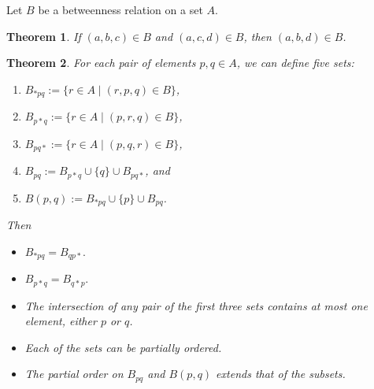 \documentclass[12pt]{article}
\newtheorem{thm}{Theorem}
\begin{document}
Let $B$ be a betweenness relation on a set $A$.
\begin{thm}
\item If $(a,b,c)\in B$ and $(a,c,d)\in B$, then $(a,b,d)\in B$.
\end{thm}
\begin{thm}
For each pair of elements $p,q\in A$,
we can define five sets:
\begin{enumerate}
\item $B_{*pq}:=\lbrace r\in A\mid (r,p,q)\in B\rbrace$,
\item $B_{p*q}:=\lbrace r\in A\mid (p,r,q)\in B\rbrace$, 
\item $B_{pq*}:=\lbrace r\in A\mid (p,q,r)\in B\rbrace$,
\item $B_{pq}:=B_{p*q}\cup\lbrace q\rbrace\cup B_{pq*}$, and
\item $B(p,q):=B_{*pq}\cup\lbrace p\rbrace\cup B_{pq}$.
\end{enumerate}
Then
\begin{itemize}
\item[(1)] $B_{*pq}=B_{qp*}.$ 
\item[(2)] $B_{p*q}=B_{q*p}.$  
\item[(3)] The intersection of any pair of the first three sets contains at most one element, either $p$ or $q$.
\item[(4)] Each of the sets can be partially ordered.  
\item[(5)] The partial order on $B_{pq}$ and $B(p,q)$ extends that of the subsets.
\end{itemize}
\end{thm}



\end{document}
